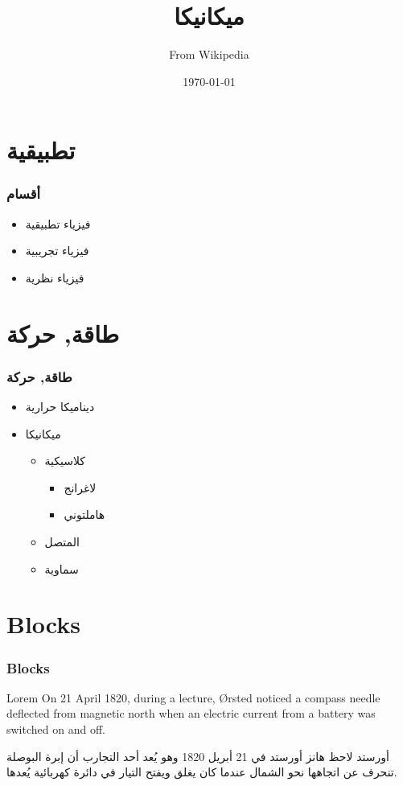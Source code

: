 \documentclass{beamer}
\title{ميكانيكا}
\author{From Wikipedia}
\date{\today}
\begin{document}
\begin{frame}
\titlepage
\end{frame}

\begin{frame}
\frametitle{\contentsname}
\tableofcontents
\end{frame}

\section{تطبيقية}

\begin{frame}
\frametitle{أقسام}
\begin{itemize}
\item فيزياء تطبيقية
\item فيزياء تجريبية
\item فيزياء نظرية
\end{itemize}
\end{frame}

\section{طاقة, حركة}

\begin{frame}
\frametitle{طاقة, حركة}
\begin{itemize}
\item ديناميكا حرارية
\item ميكانيكا
\begin{itemize}
\item كلاسيكية
\begin{itemize}
\item لاغرانج
\item هاملتوني
\end{itemize}
\item المتصل
\item سماوية
\end{itemize}
\end{itemize}
\end{frame}

\section{Blocks}

\begin{frame}
\frametitle{Blocks}

\begin{block}{Lorem}
  \foreignlanguage*{nil}{On 21 April 1820, during a lecture, Ørsted
  noticed a compass needle deflected from magnetic north when an
  electric current from a battery was switched on and off.}
\end{block}

\begin{block}{أورستد}
  لاحظ هانز أورستد في 21 أبريل 1820 وهو يُعد أحد التجارب أن إبرة
  البوصلة تنحرف عن اتجاهها نحو الشمال عندما كان يغلق ويفتح التيار في
  دائرة كهربائية يُعدها.
\end{block}
\end{frame}
\end{document}
